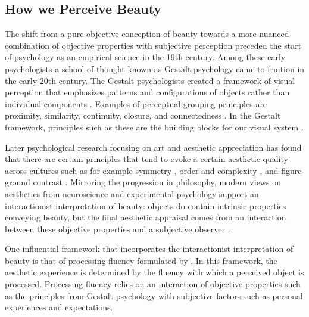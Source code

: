 \documentclass[../main.tex]{subfiles}
\begin{document}
\subsection{How we Perceive Beauty}
The shift from a pure objective conception of beauty towards a more nuanced combination of objective properties with subjective perception preceded the start of psychology as an empirical science in the 19th century. Among these early psychologists a school of thought known as Gestalt psychology came to fruition in the early 20th century. The Gestalt psychologists created a framework of visual perception that emphasizes patterns and configurations of objects rather than individual components \parencite{wagemansCenturyGestaltPsychology2012a}. Examples of perceptual grouping principles are proximity, similarity, continuity, closure, and connectedness \parencite{goldstein2009perceiving}. In the Gestalt framework, principles such as these are the building blocks for our visual system \parencite{wagemansCenturyGestaltPsychology2012a}.

Later psychological research focusing on art and aesthetic appreciation has found that there are  certain principles that tend to evoke a certain aesthetic quality across cultures such as for example symmetry \parencite{bodeCrossculturalComparisonPreference2017}, order and complexity \parencite{van2021order}, and figure-ground contrast \parencite{reberProcessingFluencyAesthetic2004}. Mirroring the progression in philosophy, modern views on aesthetics from neuroscience and experimental psychology support an interactionist interpretation of beauty: objects do contain intrinsic properties conveying beauty, but the final aesthetic appraisal comes from an interaction between these objective properties and a subjective observer \parencite{valenziseAdvancesChallengesComputational2022}.

One influential framework that incorporates the interactionist interpretation of beauty is that of processing fluency formulated by \textcite{reberProcessingFluencyAesthetic2004}. In this framework, the aesthetic experience is determined by the fluency with which a perceived object is processed. Processing fluency relies on an interaction of objective properties such as the principles from Gestalt psychology with subjective factors such as personal experiences and expectations.
\end{document}
